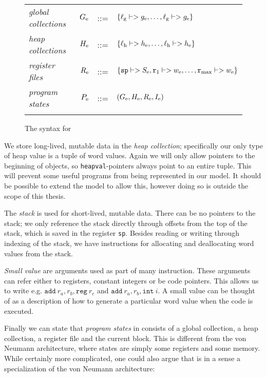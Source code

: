 \begin{figure}
{\begin{tabular}{lrcl}
      \textit{global collections} & $G_{\mathrm{e}}$ & ::= & $\{\ell_{\mathrm{g}} |-> g_{\mathrm{e}}, \dots, \ell_{\mathrm{g}} |-> g_{\mathrm{e}}\}$ \\
      \textit{heap collections}   & $H_{\mathrm{e}}$ & ::= & $\{\ell_{\mathrm{h}} |-> h_{\mathrm{e}}, \dots, \ell_{\mathrm{h}} |-> h_{\mathrm{e}}\}$ \\
      \textit{register files}     & $R_{\mathrm{e}}$ & ::= & $\{\mathtt{sp} |-> S_{\mathrm{e}}, \mathtt{r}_1 |-> w_{\mathrm{e}}, \dots, \mathtt{r}_{\mathrm{max}} |-> w_{\mathrm{e}}\}$ \\
      \textit{program states} & $P_{\mathrm{e}}$ & ::= & $(G_{\mathrm{e}}, H_{\mathrm{e}}, R_{\mathrm{e}}, I_{\mathrm{e}})$ \\\\
    \end{tabular}
  }
  \caption{The syntax for \ATALe}
  \label{fig:esyntax}
\end{figure}

We store long-lived, mutable data in the \emph{heap collection}; specifically
our only type of heap value is a tuple of word values. Again we will only allow
pointers to the beginning of objects, so \texttt{heapval}-pointers always point
to an entire tuple. This will prevent some useful programs from being
represented in our model. It should be possible to extend the model to allow
this, however doing so is outside the scope of this thesis.

The \emph{stack} is used for short-lived, mutable data. There can be no pointers
to the stack; we only reference the stack directly through offsets from the top
of the stack, which is saved in the register \texttt{sp}. Besides reading or
writing through indexing of the stack, we have instructions for allocating and
deallocating word values from the stack.

\emph{Small value} are arguments used as part of many instruction. These
arguments can refer either to registers, constant integers or be code
pointers. This allows us to write e.g.
$\mathtt{add}\ r_a, r_b, \mathtt{reg}\ r_c$ and
$\mathtt{add}\ r_a, r_b, \mathtt{int}\ i$. A small value can be thought of as a
description of how to generate a particular word value when the code is
executed.

Finally we can state that \emph{program states} in \ATALe consists of a global
collection, a heap collection, a register file and the current block. This is
different from the von Neumann architecture, where states are simply some
registers and some memory. While certainly more complicated, one could also
argue that \ATALe is in a sense a specialization of the von Neumann
architecture:

